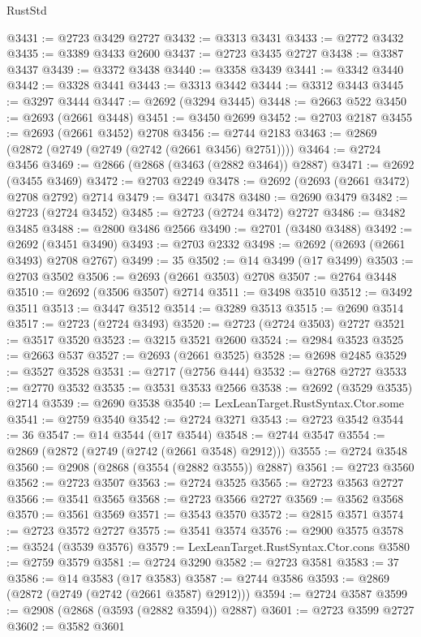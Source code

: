 \begin{lexlean}{RustStd}
\begin{coremodule}
@3431 := @2723 @3429 @2727
@3432 := @3313 @3431
@3433 := @2772 @3432
@3435 := @3389 @3433 @2600
@3437 := @2723 @3435 @2727
@3438 := @3387 @3437
@3439 := @3372 @3438
@3440 := @3358 @3439
@3441 := @3342 @3440
@3442 := @3328 @3441
@3443 := @3313 @3442
@3444 := @3312 @3443
@3445 := @3297 @3444
@3447 := @2692 (@3294 @3445)
@3448 := @2663 @522
@3450 := @2693 (@2661 @3448)
@3451 := @3450 @2699
@3452 := @2703 @2187
@3455 := @2693 (@2661 @3452) @2708
@3456 := @2744 @2183
@3463 := @2869 (@2872 (@2749 (@2749 (@2742 (@2661 @3456) @2751))))
@3464 := @2724 @3456
@3469 := @2866 (@2868 (@3463 (@2882 @3464)) @2887)
@3471 := @2692 (@3455 @3469)
@3472 := @2703 @2249
@3478 := @2692 (@2693 (@2661 @3472) @2708 @2792) @2714
@3479 := @3471 @3478
@3480 := @2690 @3479
@3482 := @2723 (@2724 @3452)
@3485 := @2723 (@2724 @3472) @2727
@3486 := @3482 @3485
@3488 := @2800 @3486 @2566
@3490 := @2701 (@3480 @3488)
@3492 := @2692 (@3451 @3490)
@3493 := @2703 @2332
@3498 := @2692 (@2693 (@2661 @3493) @2708 @2767)
@3499 := 35
@3502 := @14 @3499 (@17 @3499)
@3503 := @2703 @3502
@3506 := @2693 (@2661 @3503) @2708
@3507 := @2764 @3448
@3510 := @2692 (@3506 @3507) @2714
@3511 := @3498 @3510
@3512 := @3492 @3511
@3513 := @3447 @3512
@3514 := @3289 @3513
@3515 := @2690 @3514
@3517 := @2723 (@2724 @3493)
@3520 := @2723 (@2724 @3503) @2727
@3521 := @3517 @3520
@3523 := @3215 @3521 @2600
@3524 := @2984 @3523
@3525 := @2663 @537
@3527 := @2693 (@2661 @3525)
@3528 := @2698 @2485
@3529 := @3527 @3528
@3531 := @2717 (@2756 @444)
@3532 := @2768 @2727
@3533 := @2770 @3532
@3535 := @3531 @3533 @2566
@3538 := @2692 (@3529 @3535) @2714
@3539 := @2690 @3538
@3540 := LexLeanTarget.RustSyntax.Ctor.some
@3541 := @2759 @3540
@3542 := @2724 @3271
@3543 := @2723 @3542
@3544 := 36
@3547 := @14 @3544 (@17 @3544)
@3548 := @2744 @3547
@3554 := @2869 (@2872 (@2749 (@2742 (@2661 @3548) @2912)))
@3555 := @2724 @3548
@3560 := @2908 (@2868 (@3554 (@2882 @3555)) @2887)
@3561 := @2723 @3560
@3562 := @2723 @3507
@3563 := @2724 @3525
@3565 := @2723 @3563 @2727
@3566 := @3541 @3565
@3568 := @2723 @3566 @2727
@3569 := @3562 @3568
@3570 := @3561 @3569
@3571 := @3543 @3570
@3572 := @2815 @3571
@3574 := @2723 @3572 @2727
@3575 := @3541 @3574
@3576 := @2900 @3575
@3578 := @3524 (@3539 @3576)
@3579 := LexLeanTarget.RustSyntax.Ctor.cons
@3580 := @2759 @3579
@3581 := @2724 @3290
@3582 := @2723 @3581
@3583 := 37
@3586 := @14 @3583 (@17 @3583)
@3587 := @2744 @3586
@3593 := @2869 (@2872 (@2749 (@2742 (@2661 @3587) @2912)))
@3594 := @2724 @3587
@3599 := @2908 (@2868 (@3593 (@2882 @3594)) @2887)
@3601 := @2723 @3599 @2727
@3602 := @3582 @3601

\end{coremodule}
\end{lexlean}
